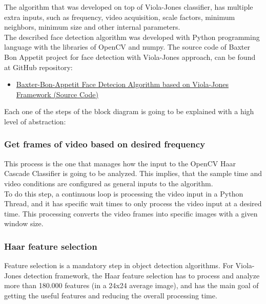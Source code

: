 \documentclass[11pt]{report} %
\begin{document}
The algorithm that was developed on top of Viola-Jones classifier, has multiple extra inputs, such as frequency, video acquisition, scale factors, minimum neighbors, minimum size and other internal parameters.\\

The described face detection algorithm was developed with Python programming language with the libraries of OpenCV and numpy. The source code of Baxter Bon Appetit project for face detection with Viola-Jones approach, can be found at  GitHub repository:


\begin{itemize}
    \color{blue}
    \item \href{https://github.com/san99tiago/baxter-bon-appetit/tree/main/python/computer_vision/face_detect_haar_cascade}{Baxter-Bon-Appetit Face Detecion Algorithm based on Viola-Jones Framework (Source Code)}
\end{itemize}


Each one of the steps of the block diagram is going to be explained with a high level of abstraction:

\subsubsection{Get frames of video based on desired frequency}

This process is the one that manages how the input to the OpenCV Haar Cascade Classifier is going to be analyzed. This implies, that the sample time and video conditions are configured as general inputs to the algorithm.\\

To do this step, a continuous loop is processing the video input in a Python Thread, and it has specific wait times to only process the video input at a desired time. This processing converts the video frames into specific images with a given window size.\\

\subsubsection{Haar feature selection}

Feature selection is a mandatory step in object detection algorithms. For Viola-Jones detection framework, the Haar feature selection has to process and analyze more than 180.000 features (in a 24x24 average image), and has the main goal of getting the useful features and reducing the overall processing time.\\
\end{document}
